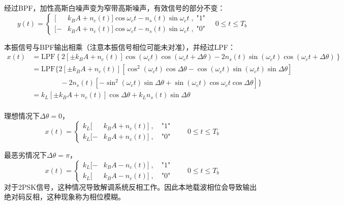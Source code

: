         经过BPF，加性高斯白噪声变为窄带高斯噪声，有效信号的部分不变：
        \begin{equation}
            y(t)=
            \left\{\begin{aligned}{}
                [ &k_BA+n_c(t)]\cos\omega_ct-n_s(t)\sin\omega_ct\;,\; \mbox{"1"}\\
                [-&k_BA+n_c(t)]\cos\omega_ct-n_s(t)\sin\omega_ct\;,\; \mbox{"0"}
            \end{aligned}\right.
            \quad 0\leqslant t\leqslant T_b
        \end{equation}
        
        本振信号与BPF输出相乘（注意本振信号相位可能未对准），并经过LPF：
        \begin{equation}
            \begin{aligned}
                x(t)&=\mathrm{LPF}\left\{2[\pm k_BA+n_c(t)]\cos(\omega_ct)\cos(\omega_ct+\Delta\theta)-2n_s(t)\sin(\omega_ct)\cos(\omega_ct+\Delta\theta)\right\}\\
                &=\mathrm{LPF}\{2[\pm k_BA+n_c(t)][\cos^2(\omega_ct)\cos \Delta \theta-\cos(\omega_ct)\sin(\omega_ct)\sin \Delta \theta]\\
                                & \qquad \qquad -2n_s(t)[-\sin^2(\omega_ct)\sin \Delta \theta+\sin(\omega_ct)\cos\omega_ct\cos \Delta \theta]\}\\
                &=k_L[\pm k_BA+n_c(t)]\cos \Delta \theta +k_Ln_s(t)\sin \Delta \theta\\
            \end{aligned}
        \end{equation}
        
        理想情况下$\Delta \theta=0$，
        \begin{equation}
            x(t)=
            \left\{\begin{aligned}{}
                k_L [&k_BA+n_c(t)]\;,\quad \mbox{"1"}\\
                k_L[-&k_BA+n_c(t)]\;,\quad \mbox{"0"}
            \end{aligned}\right.
            \qquad 0\leqslant t\leqslant T_b
        \end{equation}
        
        最恶劣情况下$\Delta \theta=\pi$，
        \begin{equation}
            x(t)=
            \left\{\begin{aligned}{}
                k_L [-&k_BA-n_c(t)]\;,\quad \mbox{"1"}\\
                k_L[&k_BA-n_c(t)]\;,\quad \mbox{"0"}
            \end{aligned}\right.
            \qquad 0\leqslant t\leqslant T_b
        \end{equation}
        对于2PSK信号，这种情况导致解调系统反相工作。因此本地载波相位会导致输出绝对码反相，这种现象称为相位模糊。

